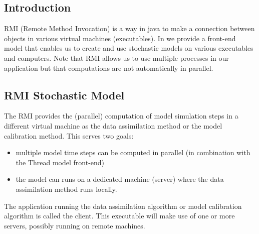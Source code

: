 \subsection{Introduction}
RMI (Remote Method Invocation) is a way in java to make a connection between
objects in various virtual machines (executables). In \oda we provide a
front-end model that enables us to create and use stochastic models on various
executables and computers. Note that RMI allows us to use multiple processes in
our application but that computations are not automatically in parallel.

\subsection{RMI Stochastic Model}
The RMI provides the (parallel) computation of model simulation steps in a
different virtual machine as the data assimilation method or the model
calibration method. This serves two goals:
\begin{itemize}
\item multiple model time steps can be computed in parallel (in combination
  with the Thread model front-end)
\item the model can runs on a dedicated machine (server) where the data
  assimilation method runs locally.
\end{itemize}

The \oda application running the data assimilation algorithm or model
calibration algorithm is called the client. This executable will make use of
one or more servers, possibly running on remote machines.

